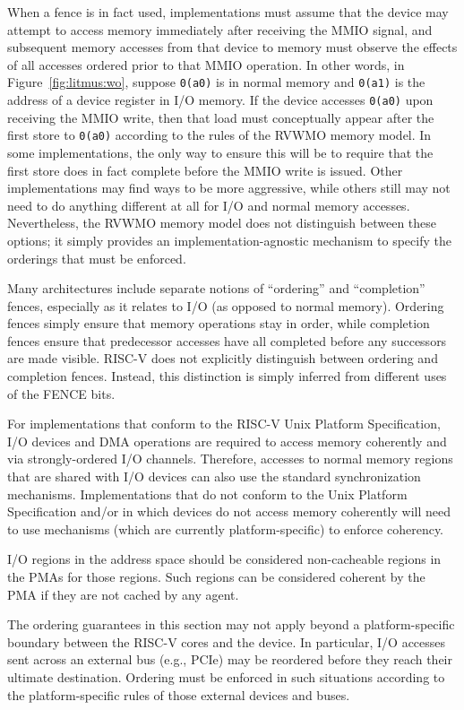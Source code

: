 When a fence is in fact used, implementations must assume that the device may attempt to access memory immediately after receiving the MMIO signal, and subsequent memory accesses from that device to memory must observe the effects of all accesses ordered prior to that MMIO operation.
In other words, in Figure~\ref{fig:litmus:wo}, suppose {\tt 0(a0)} is in normal memory and {\tt 0(a1)} is the address of a device register in I/O memory.
If the device accesses {\tt 0(a0)} upon receiving the MMIO write, then that load must conceptually appear after the first store to {\tt 0(a0)} according to the rules of the RVWMO memory model.
In some implementations, the only way to ensure this will be to require that the first store does in fact complete before the MMIO write is issued.
Other implementations may find ways to be more aggressive, while others still may not need to do anything different at all for I/O and normal memory accesses.
Nevertheless, the RVWMO memory model does not distinguish between these options; it simply provides an implementation-agnostic mechanism to specify the orderings that must be enforced.

Many architectures include separate notions of ``ordering'' and ``completion'' fences, especially as it relates to I/O (as opposed to normal memory).
Ordering fences simply ensure that memory operations stay in order, while completion fences ensure that predecessor accesses have all completed before any successors are made visible.
RISC-V does not explicitly distinguish between ordering and completion fences.
Instead, this distinction is simply inferred from different uses of the FENCE bits.

For implementations that conform to the RISC-V Unix Platform Specification, I/O devices and DMA operations are required to access memory coherently and via strongly-ordered I/O channels.
Therefore, accesses to normal memory regions that are shared with I/O devices can also use the standard synchronization mechanisms.
Implementations that do not conform to the Unix Platform Specification and/or in which devices do not access memory coherently will need to use mechanisms (which are currently platform-specific) to enforce coherency.

I/O regions in the address space should be considered non-cacheable regions in the PMAs for those regions.  Such regions can be considered coherent by the PMA if they are not cached by any agent.

The ordering guarantees in this section may not apply beyond a platform-specific boundary between the RISC-V cores and the device.  In particular, I/O accesses sent across an external bus (e.g., PCIe) may be reordered before they reach their ultimate destination.  Ordering must be enforced in such situations according to the platform-specific rules of those external devices and buses.

